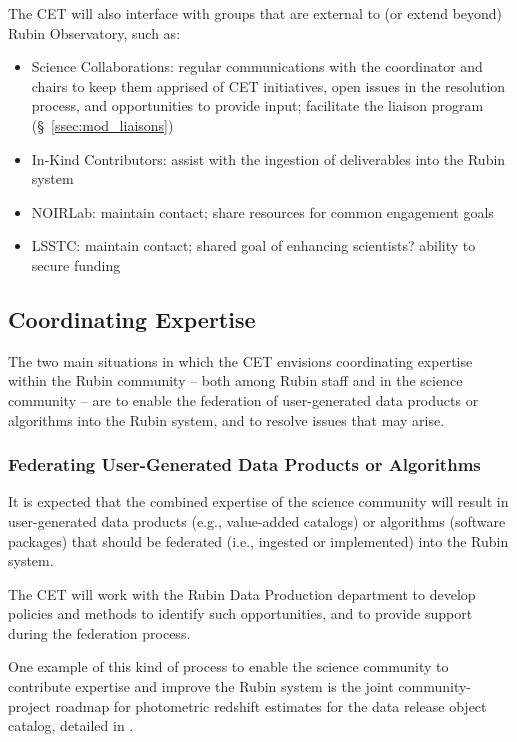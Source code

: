 \documentclass[DM,lsstdraft,toc]{lsstdoc}
\begin{document}
The CET will also interface with groups that are external to (or extend beyond) Rubin Observatory, such as:
\begin{itemize}
\item Science Collaborations: regular communications with the coordinator and chairs to keep them apprised of CET initiatives, open issues in the resolution process, and opportunities to provide input; facilitate the liaison program (\S~\ref{ssec:mod_liaisons})
\item In-Kind Contributors: assist with the ingestion of deliverables into the Rubin system
\item NOIRLab: maintain contact; share resources for common engagement goals
\item LSSTC: maintain contact; shared goal of enhancing scientists? ability to secure funding
\end{itemize}


\subsection{Coordinating Expertise}\label{ssec:mod_coord}

The two main situations in which the CET envisions coordinating expertise within the Rubin community -- both among Rubin staff and in the science community -- are to enable the federation of user-generated data products or algorithms into the Rubin system, and to resolve issues that may arise.


\subsubsection{Federating User-Generated Data Products or Algorithms}\label{sssec:mod_coord_ug}

It is expected that the combined expertise of the science community will result in user-generated data products (e.g., value-added catalogs) or algorithms (software packages) that should be federated (i.e., ingested or implemented) into the Rubin system.

The CET will work with the Rubin Data Production department to develop policies and methods to identify such opportunities, and to provide support during the federation process.

One example of this kind of process to enable the science community to contribute expertise and improve the Rubin system is the joint community-project roadmap for photometric redshift estimates for the data release object catalog, detailed in .
\end{document}
